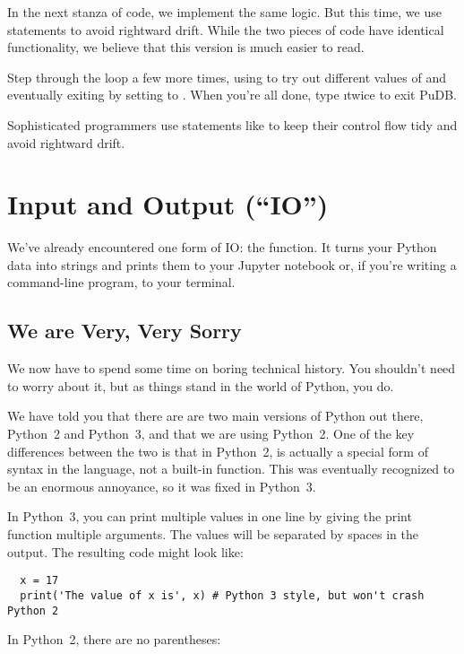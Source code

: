 \documentclass[letterpaper, 12pt, titlepage, twoside]{article}
\begin{document}
In the next stanza of code, we implement the same logic. But this time, we use
 statements to avoid rightward drift. While the two pieces of code
have identical functionality, we believe that this version is \i{much} easier
to read.

\typeit Step through the loop a few more times, using  to try out
different values of  and eventually exiting by setting
 to . When you're all done, type  \i{twice} to
exit PuDB.

Sophisticated programmers use statements like  to keep their
control flow tidy and avoid rightward drift.


\newpage
\section{Input and Output (``IO'')}

We've already encountered one form of IO: the  function. It turns
your Python data into strings and prints them to your Jupyter notebook or, if
you're writing a command-line program, to your terminal.

\subsection*{We are Very, Very Sorry}

We now have to spend some time on boring technical history. You shouldn't need
to worry about it, but as things stand in the world of Python, you do.

We have told you that there are are two main versions of Python out there,
Python~2 and Python~3, and that we are using Python~2. One of the key
differences between the two is that in Python~2,  is actually a
special form of syntax in the language, not a built-in function. This was
eventually recognized to be an enormous annoyance, so it was fixed in
Python~3.

In Python~3, you can print multiple values in one line by giving the print
function multiple arguments. The values will be separated by spaces in the
output. The resulting code might look like:

\begin{lstlisting}
  x = 17
  print('The value of x is', x) # Python 3 style, but won't crash Python 2
\end{lstlisting}

In Python~2, there are no parentheses:
\end{document}
